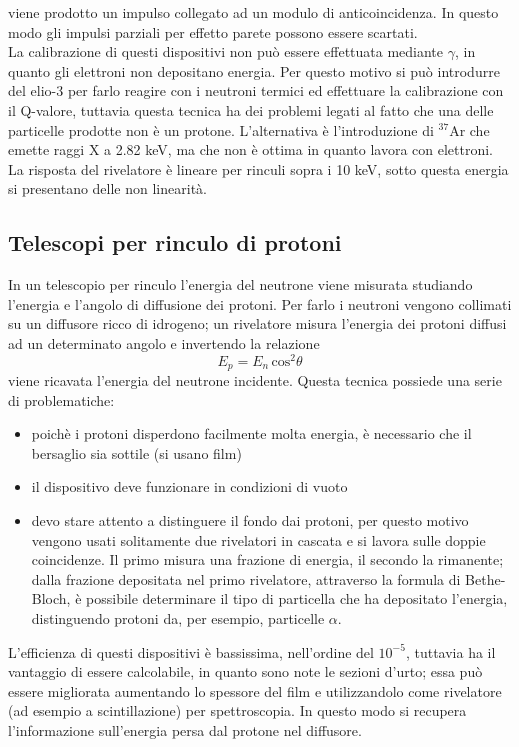 viene prodotto un impulso collegato ad un modulo di anticoincidenza.
In questo modo gli impulsi parziali per effetto parete possono essere scartati.\\
La calibrazione di questi dispositivi non pu\`o essere effettuata mediante $\gamma$, in quanto gli elettroni non depositano energia.
Per questo motivo si pu\`o introdurre del elio-3 per farlo reagire con i neutroni termici ed effettuare la calibrazione con il Q-valore, tuttavia
questa tecnica ha dei problemi legati al fatto che una delle particelle prodotte non \`e un protone.
L'alternativa \`e l'introduzione di $^{37}$Ar che emette raggi X a 2.82 keV, ma che non \`e ottima in quanto lavora con elettroni.\\
La risposta del rivelatore \`e lineare per rinculi sopra i 10 keV, sotto questa energia si presentano delle non linearit\`a.
\subsection{Telescopi per rinculo di protoni}
In un telescopio per rinculo l'energia del neutrone viene misurata studiando l'energia e l'angolo di diffusione dei protoni.
Per farlo i neutroni vengono collimati su un diffusore ricco di idrogeno; un rivelatore misura l'energia dei protoni diffusi ad un determinato angolo
e invertendo la relazione
\begin{equation*}
E_p = E_n \, \text{cos}^2\theta
\end{equation*}
viene ricavata l'energia del neutrone incidente.
Questa tecnica possiede una serie di problematiche:
\begin{itemize}
\item poich\`e i protoni disperdono facilmente molta energia, \`e necessario che il bersaglio sia sottile (si usano film)
\item il dispositivo deve funzionare in condizioni di vuoto
\item devo stare attento a distinguere il fondo dai protoni, per questo motivo vengono usati solitamente due rivelatori in cascata e si lavora
sulle doppie coincidenze.
Il primo misura una frazione di energia, il secondo la rimanente; dalla frazione depositata nel primo rivelatore, attraverso la formula di Bethe-Bloch, \`e
possibile determinare il tipo di particella che ha depositato l'energia, distinguendo protoni da, per esempio, particelle $\alpha$.
\end{itemize}
L'efficienza di questi dispositivi \`e bassissima, nell'ordine del $10^{-5}$, tuttavia ha il vantaggio di essere calcolabile, in quanto sono note
le sezioni d'urto; essa pu\`o essere migliorata aumentando lo spessore del film e utilizzandolo come rivelatore (ad esempio a scintillazione) per
spettroscopia.
In questo modo si recupera l'informazione sull'energia persa dal protone nel diffusore.
